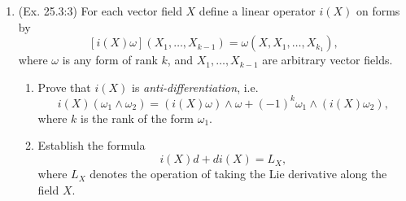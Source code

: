 \begin{enumerate}
	\item (Ex. 25.3:3) For each vector field $X$ define a linear operator $i(X)$ on forms by
	\[ [i(X)\omega](X_1, \dots, X_{k-1}) = \omega(X, X_1, \dots, X_{k_1}), \] where $\omega$ is any form of rank $k$, and $X_1, \dots, X_{k-1}$ are arbitrary vector fields.
	\begin{enumerate}
		\item Prove that $i(X)$ is \emph{anti-differentiation}, i.e.
		\[ i(X)(\omega_1 \wedge \omega_2) = (i(X)\omega) \wedge \omega + (-1)^k \omega_1 \wedge (i(X)\omega_2), \]
		where $k$ is the rank of the form $\omega_1$.
		\item Establish the formula \[ i(X)d + d i(X) = L_X, \] where $L_X$ denotes the operation of taking the Lie derivative along the field $X$.
	\end{enumerate}
\end{enumerate}

